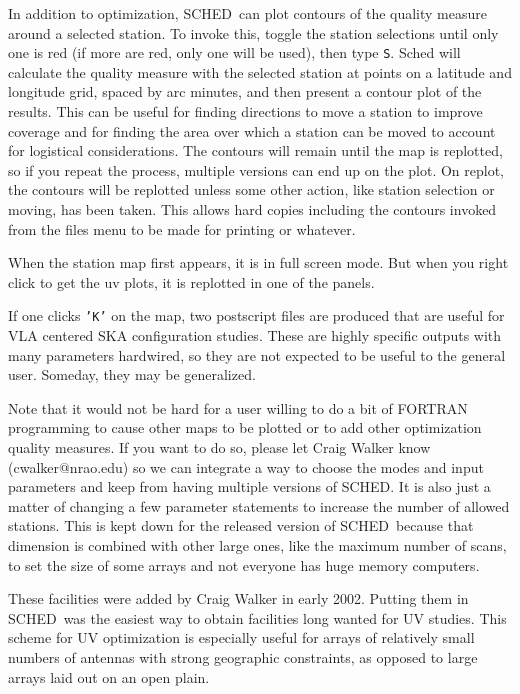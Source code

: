 \documentclass{report}
\newcommand{\sched}{{\sc SCHED}}
\newcommand{\schedb}{{\sc SCHED~}}
\begin{document}
In addition to optimization, \schedb can plot contours of the quality
measure around a selected station.  To invoke this, toggle the station
selections until only one is red (if more are red, only one will be
used), then type {\tt S}.  Sched will calculate the quality measure
with the selected station at points on a latitude and longitude grid,
spaced by  arc minutes, and then
present a contour plot of the results.  This can be useful for finding
directions to move a station to improve coverage and for finding
the area over which a station can be moved to account for logistical
considerations.  The contours will remain until the map is replotted,
so if you repeat the process, multiple versions can end up on the
plot.  On replot, the contours will be replotted unless some other
action, like station selection or moving, has been taken.  This allows
hard copies including the contours invoked from the files menu to be made
for printing or whatever.

When the station map first appears, it is in full screen
mode.  But when you right click to get the uv plots, it is replotted
in one of the panels.

If one clicks {\tt 'K'} on the map, two postscript files are produced
that are useful for VLA centered SKA configuration studies.  These
are highly specific outputs with many parameters hardwired, so they
are not expected to be useful to the general user.  Someday, they
may be generalized.

Note that it would not be hard for a user willing to do a bit of
FORTRAN programming to cause other maps to be plotted or to add other
optimization quality measures.  If you want to do so, please let Craig
Walker know (cwalker@nrao.edu) so we can integrate a way to choose the
modes and input parameters and keep from having multiple versions of
\sched.  It is also just a matter of changing a few parameter statements
to increase the number of allowed stations.  This is kept down for
the released version of \schedb because that dimension is combined
with other large ones, like the maximum number of scans, to set the
size of some arrays and not everyone has huge memory computers.

These facilities were added by Craig Walker in early 2002.  Putting
them in \schedb was the easiest way to obtain facilities long wanted
for UV studies.  This scheme for UV optimization is especially useful
for arrays of relatively small numbers of antennas with strong
geographic constraints, as opposed to large arrays laid out on an open
plain.
\end{document}
